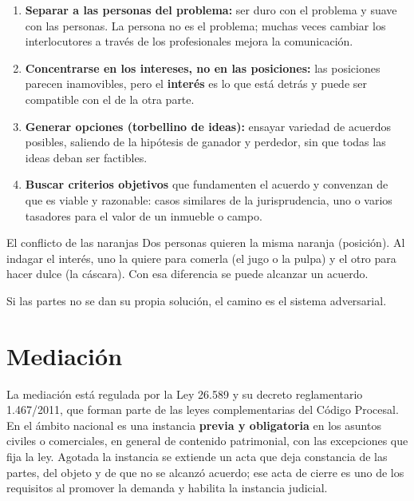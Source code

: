 \documentclass[12pt,oneside]{book}
\begin{document}
\begin{enumerate}
\item \textbf{Separar a las personas del problema:} ser duro con el problema y suave con las personas. La persona no es el problema; muchas veces cambiar los interlocutores a través de los profesionales mejora la comunicación.
\item \textbf{Concentrarse en los intereses, no en las posiciones:} las posiciones parecen inamovibles, pero el \textbf{interés} es lo que está detrás y puede ser compatible con el de la otra parte.
\item \textbf{Generar opciones (torbellino de ideas):} ensayar variedad de acuerdos posibles, saliendo de la hipótesis de ganador y perdedor, sin que todas las ideas deban ser factibles.
\item \textbf{Buscar criterios objetivos} que fundamenten el acuerdo y convenzan de que es viable y razonable: casos similares de la jurisprudencia, uno o varios tasadores para el valor de un inmueble o campo.
\end{enumerate}

\begin{ejemplo}{El conflicto de las naranjas}
Dos personas quieren la misma naranja (posición). Al indagar el interés, uno la quiere para comerla (el jugo o la pulpa) y el otro para hacer dulce (la cáscara). Con esa diferencia se puede alcanzar un acuerdo.
\end{ejemplo}

Si las partes no se dan su propia solución, el camino es el sistema adversarial.

\section{Mediación}

La mediación está regulada por la Ley 26.589 y su decreto reglamentario 1.467/2011, que forman parte de las leyes complementarias del Código Procesal. En el ámbito nacional es una instancia \textbf{previa y obligatoria} en los asuntos civiles o comerciales, en general de contenido patrimonial, con las excepciones que fija la ley. Agotada la instancia se extiende un acta que deja constancia de las partes, del objeto y de que no se alcanzó acuerdo; ese acta de cierre es uno de los requisitos al promover la demanda y habilita la instancia judicial.
\end{document}

